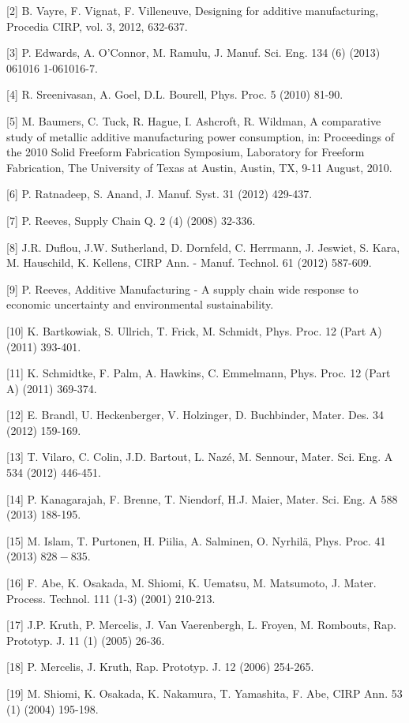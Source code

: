 \documentclass[10pt]{article}
\begin{document}
[2] B. Vayre, F. Vignat, F. Villeneuve, Designing for additive manufacturing, Procedia CIRP, vol. 3, 2012, 632-637.

[3] P. Edwards, A. O'Connor, M. Ramulu, J. Manuf. Sci. Eng. 134 (6) (2013) 061016 1-061016-7.

[4] R. Sreenivasan, A. Goel, D.L. Bourell, Phys. Proc. 5 (2010) 81-90.

[5] M. Baumers, C. Tuck, R. Hague, I. Ashcroft, R. Wildman, A comparative study of metallic additive manufacturing power consumption, in: Proceedings of the 2010 Solid Freeform Fabrication Symposium, Laboratory for Freeform Fabrication, The University of Texas at Austin, Austin, TX, 9-11 August, 2010.

[6] P. Ratnadeep, S. Anand, J. Manuf. Syst. 31 (2012) 429-437.

[7] P. Reeves, Supply Chain Q. 2 (4) (2008) 32-336.

[8] J.R. Duflou, J.W. Sutherland, D. Dornfeld, C. Herrmann, J. Jeswiet, S. Kara, M. Hauschild, K. Kellens, CIRP Ann. - Manuf. Technol. 61 (2012) 587-609.

[9] P. Reeves, Additive Manufacturing - A supply chain wide response to economic uncertainty and environmental sustainability.

[10] K. Bartkowiak, S. Ullrich, T. Frick, M. Schmidt, Phys. Proc. 12 (Part A) (2011) 393-401.

[11] K. Schmidtke, F. Palm, A. Hawkins, C. Emmelmann, Phys. Proc. 12 (Part A) (2011) 369-374.

[12] E. Brandl, U. Heckenberger, V. Holzinger, D. Buchbinder, Mater. Des. 34 (2012) 159-169.

[13] T. Vilaro, C. Colin, J.D. Bartout, L. Nazé, M. Sennour, Mater. Sci. Eng. A 534 (2012) 446-451.

[14] P. Kanagarajah, F. Brenne, T. Niendorf, H.J. Maier, Mater. Sci. Eng. A 588 (2013) 188-195.

[15] M. Islam, T. Purtonen, H. Piilia, A. Salminen, O. Nyrhilä, Phys. Proc. 41 (2013) $828-835$.

[16] F. Abe, K. Osakada, M. Shiomi, K. Uematsu, M. Matsumoto, J. Mater. Process. Technol. 111 (1-3) (2001) 210-213.

[17] J.P. Kruth, P. Mercelis, J. Van Vaerenbergh, L. Froyen, M. Rombouts, Rap. Prototyp. J. 11 (1) (2005) 26-36.

[18] P. Mercelis, J. Kruth, Rap. Prototyp. J. 12 (2006) 254-265.

[19] M. Shiomi, K. Osakada, K. Nakamura, T. Yamashita, F. Abe, CIRP Ann. 53 (1) (2004) 195-198.
\end{document}
